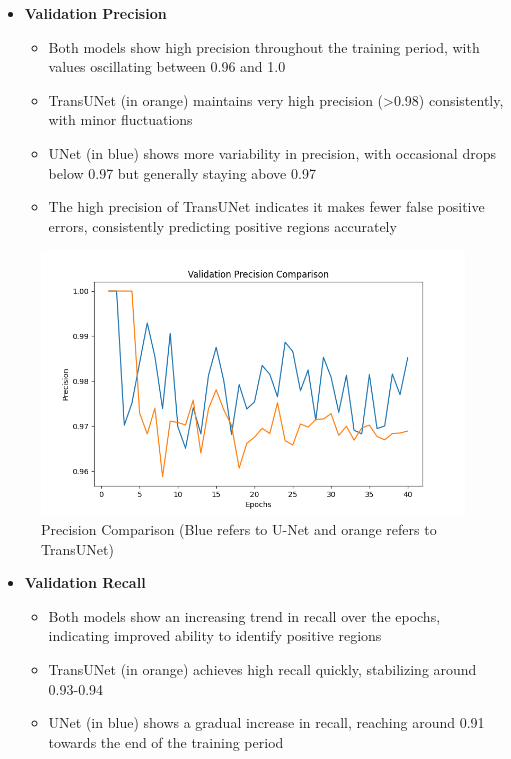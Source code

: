 \documentclass[11pt,a4paper]{article}
\begin{document}
\pagebreak
\begin{itemize}
    \item \textbf{Validation Precision}
    \begin{itemize}
        \item Both models show high precision throughout the training period, with values oscillating between 0.96 and 1.0
        \item TransUNet (in orange) maintains very high precision (>0.98) consistently, with minor fluctuations
        \item UNet (in blue) shows more variability in precision, with occasional drops below 0.97 but generally staying above 0.97
        \item The high precision of TransUNet indicates it makes fewer false positive errors, consistently predicting positive regions accurately
    \end{itemize}
\end{itemize}
\begin{figure}[H]
    \centering
    \includegraphics[width= 0.9\linewidth]{Precision.png}
    \caption{Precision Comparison (Blue refers to U-Net and orange refers to TransUNet)}
\end{figure}
\pagebreak
\begin{itemize}
    \item \textbf{Validation Recall}
    \begin{itemize}
        \item Both models show an increasing trend in recall over the epochs, indicating improved ability to identify positive regions
        \item TransUNet (in orange) achieves high recall quickly, stabilizing around 0.93-0.94
        \item UNet (in blue) shows a gradual increase in recall, reaching around 0.91 towards the end of the training period
    \end{itemize}
\end{itemize}
\end{document}
